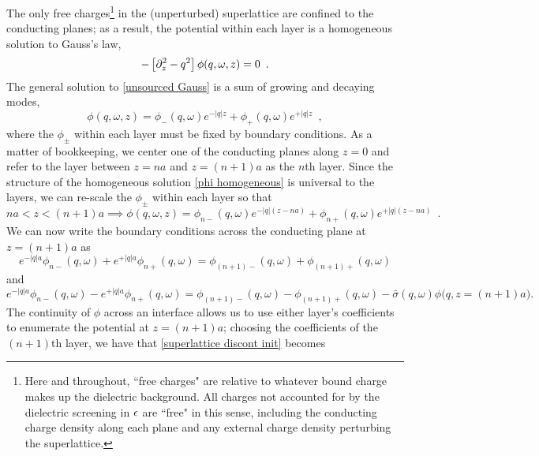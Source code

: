 The only free charges\footnote{Here and throughout, ``free charges" are relative to whatever bound charge makes up the dielectric background.  All charges not accounted for by the dielectric screening in $\epsilon$ are ``free" in this sense, including the conducting charge density along each plane and any external charge density perturbing the superlattice.} in the (unperturbed) superlattice are confined to the conducting planes; as a result, the potential within each layer is a homogeneous solution to Gauss's law,
\begin{equation}
    \label{unsourced Gauss}
    -\left[\partial_z^2-q^2\right]\phi(q,\omega,z) = 0
    \,\,\,.
\end{equation}
The general solution to \eqref{unsourced Gauss} is a sum of growing and decaying modes,
\begin{equation}
    \label{phi homogeneous}
    \phi(q,\omega,z) = \phi_-(q,\omega) e^{-|q|z} + \phi_+(q,\omega) e^{+|q|z}
    \,\,\,,
\end{equation}
where the $\phi_\pm$ within each layer must be fixed by boundary conditions.  As a matter of bookkeeping, we center one of the conducting planes along $z=0$ and refer to the layer between $z=na$ and $z=(n+1)a$ as the $n$th layer.  Since the structure of the homogeneous solution \eqref{phi homogeneous} is universal to the layers, we can re-scale the $\phi_{\pm}$ within each layer so that
\begin{equation}
    \label{nth layer phi}
    na<z<(n+1)a\implies
    \phi(q,\omega,z) = \phi_{n-}(q,\omega) e^{-|q|(z-na)} + \phi_{n+}(q,\omega)e^{+|q|(z-na)}
    \,\,\,.
\end{equation}
We can now write the boundary conditions across the conducting plane at $z=(n+1)a$ as
\begin{equation}
    \label{superlattice cont init}
    e^{-|q|a} \phi_{n-}(q,\omega) + e^{+|q|a}\phi_{n+}(q,\omega) = 
    \phi_{(n+1)-}(q,\omega)+\phi_{(n+1)+}(q,\omega)
\end{equation}
and
\begin{equation}
    \label{superlattice discont init}
    e^{-|q|a} \phi_{n-}(q,\omega) - e^{+|q|a}\phi_{n+}(q,\omega) = 
    \phi_{(n+1)-}(q,\omega)-\phi_{(n+1)+}(q,\omega)
    -
    \bar\sigma(q,\omega)\phi\big(q,z=(n+1)a\big)
    .
\end{equation}
The continuity of $\phi$ across an interface allows us to use either layer's coefficients to enumerate the potential at $z=(n+1)a$; choosing the coefficients of the $(n+1)$th layer, we have that \eqref{superlattice discont init} becomes
